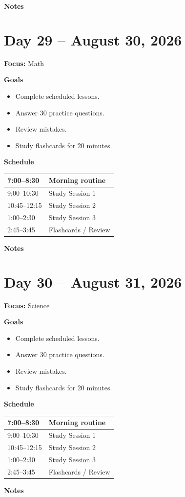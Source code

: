 \vspace{1em}
\textbf{Notes}

\vspace{8cm}

\newpage

\section*{Day 29 -- August 30, 2026}
\textbf{Focus:} Math

\textbf{Goals}
\begin{itemize}
\item Complete scheduled lessons.
\item Answer 30 practice questions.
\item Review mistakes.
\item Study flashcards for 20 minutes.
\end{itemize}

\textbf{Schedule}
\begin{tabular}{|p{4cm}|p{10cm}|}\hline
7:00--8:30 & Morning routine \\\hline
9:00--10:30 & Study Session 1 \\\hline
10:45--12:15 & Study Session 2 \\\hline
1:00--2:30 & Study Session 3 \\\hline
2:45--3:45 & Flashcards / Review \\\hline
\end{tabular}

\vspace{1em}
\textbf{Notes}

\vspace{8cm}

\newpage

\section*{Day 30 -- August 31, 2026}
\textbf{Focus:} Science

\textbf{Goals}
\begin{itemize}
\item Complete scheduled lessons.
\item Answer 30 practice questions.
\item Review mistakes.
\item Study flashcards for 20 minutes.
\end{itemize}

\textbf{Schedule}
\begin{tabular}{|p{4cm}|p{10cm}|}\hline
7:00--8:30 & Morning routine \\\hline
9:00--10:30 & Study Session 1 \\\hline
10:45--12:15 & Study Session 2 \\\hline
1:00--2:30 & Study Session 3 \\\hline
2:45--3:45 & Flashcards / Review \\\hline
\end{tabular}

\vspace{1em}
\textbf{Notes}

\vspace{8cm}

\newpage
